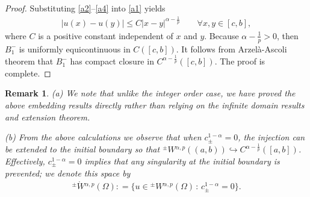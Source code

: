 \documentclass[leqno,final]{siamltex}
\numberwithin{equation}{section}
\newtheorem{remark}{Remark}[section]
\renewcommand{\(}{\bigl(}
\renewcommand{\)}{\bigr)}
\begin{document}
\begin{proof}
        
        Substituting \eqref{a2}--\eqref{a4} into \eqref{a1} yields 
        \begin{align}\label{a5}
        |u(x) - u(y)| \leq C|x-y|^{\alpha -\frac{1}{p}} \qquad \forall x, y\in [c,b],  
        \end{align}
        where $C$ is a positive constant independent of $x$ and $y$. 
        Because $\alpha -\frac{1}{p}>0$, then ${B}^{-}_{1}$ is uniformly equicontinuous in $C([c,b])$. It follows from  Arzel\`a-Ascoli theorem that ${B}^{-}_{1}$ has compact closure in $C^{\alpha - \frac{1}{p}}([c,b])$. The proof is complete. 
    \end{proof}
    
    
    \begin{remark}
    	(a) We note that unlike the integer order case, we have proved the above 
    	embedding results directly rather than relying on the infinite domain results and extension theorem. 
    	
    	(b) From the above calculations we observe that when $c_{\pm}^{1-\alpha} = 0$, the injection can be extended to the initial boundary so that ${^{\pm}}{W}{^{\alpha,p}}((a,b)) \hookrightarrow C^{\alpha - \frac{1}{p}}([a,b])$. Effectively,  $c^{1-\alpha}_{\pm} = 0$ implies that any singularity at the initial boundary is prevented; we denote this space by 
        \begin{align}\label{mathring}
        {^{\pm}}{\mathring{W}}{^{\alpha,p}}(\Omega) : = \{ u \in {^{\pm}}{W}{^{\alpha,p}}(\Omega) \, : \, c^{1-\alpha}_{\pm} = 0\}.
        \end{align}
    \end{remark}
    
\end{document}

